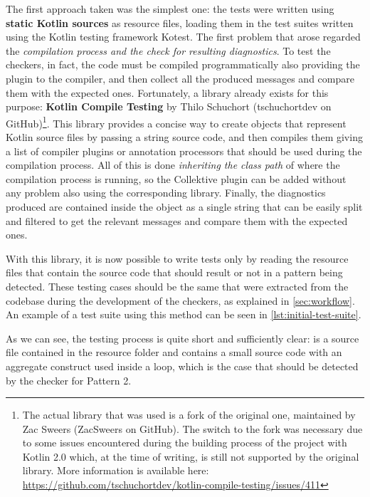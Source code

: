 \documentclass[12pt,a4paper,openright,twoside]{book}
\begin{document}
The first approach taken was the simplest one: the tests were written using
\textbf{static Kotlin sources} as resource files, loading them in the test
suites written using the Kotlin testing framework Kotest. The first problem that
arose regarded the \emph{compilation process and the check for resulting
diagnostics}. To test the checkers, in fact, the code must be compiled
programmatically also providing the plugin to the compiler, and then collect all
the produced messages and compare them with the expected ones.
%
Fortunately, a library already exists for this purpose: \textbf{Kotlin Compile
Testing} by Thilo Schuchort (tschuchortdev on GitHub)\footnote{The actual
library that was used is a fork of the original one, maintained by Zac Sweers
(ZacSweers on GitHub). The switch to the fork was necessary due to some issues
encountered during the building process of the project with Kotlin 2.0 which, at
the time of writing, is still not supported by the original library. More
information is available here:
\url{https://github.com/tschuchortdev/kotlin-compile-testing/issues/411}}. This
library provides a concise way to create objects that represent Kotlin source
files by passing a string source code, and then compiles them giving a list of
compiler plugins or annotation processors that should be used during the
compilation process. 
%
All of this is done \emph{inheriting the class path} of where the compilation
process is running, so the Collektive plugin can be added without any problem
also using the corresponding library. Finally, the diagnostics produced are
contained inside the  object as a single string
that can be easily split and filtered to get the relevant messages and compare
them with the expected ones.

With this library, it is now possible to write tests only by reading the
resource files that contain the source code that should result or not in a
pattern being detected. These testing cases should be the same that were
extracted from the codebase during the development of the checkers, as explained
in \cref{sec:workflow}. An example of a test suite using this method can be seen
in \cref{lst:initial-test-suite}.
%

%
As we can see, the testing process is quite short and sufficiently clear:
 is a source file contained in the resource
folder and contains a small source code with an aggregate construct used inside
a loop, which is the case that should be detected by the checker for Pattern 2.
\end{document}
